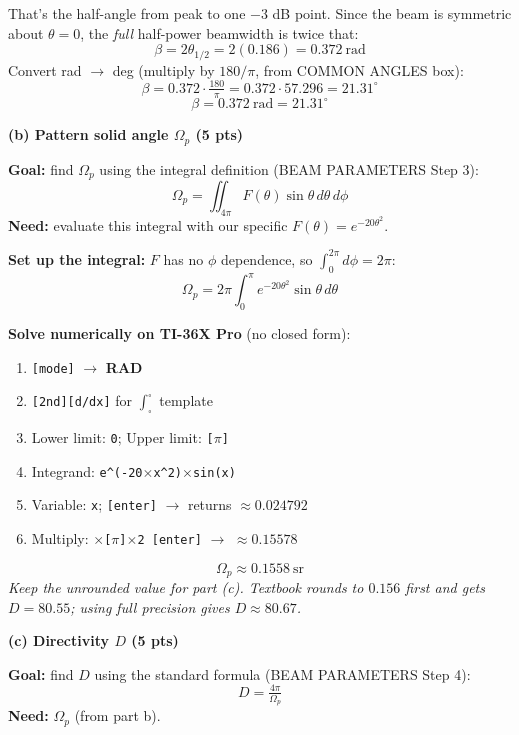 \documentclass[11pt,letterpaper]{article}
\newcommand{\goal}[1]{\textbf{\color{purple}Goal:} #1}
\newcommand{\need}[1]{\textbf{\color{coral}Need:} #1}
\begin{document}
That's the half-angle from peak to one $-3$ dB point. Since the beam is symmetric about $\theta = 0$, the \emph{full} half-power beamwidth is twice that:
\[\beta = 2\theta_{1/2} = 2(0.186) = 0.372~\text{rad}\]
Convert rad $\to$ deg (multiply by $180/\pi$, from COMMON ANGLES box):
\[\beta = 0.372 \cdot \tfrac{180}{\pi} = 0.372 \cdot 57.296 = 21.31^\circ\]
\[\boxed{\beta = 0.372~\text{rad} = 21.31^\circ}\]

\vspace{6pt}
\textbf{(b) Pattern solid angle $\Omega_p$ (5 pts)}

\begin{goalbox}
\goal{find $\Omega_p$ using the integral definition (BEAM PARAMETERS Step 3):}
\[\Omega_p = \iint_{4\pi} F(\theta)\sin\theta\,d\theta\,d\phi\]
\need{evaluate this integral with our specific $F(\theta) = e^{-20\theta^2}$.}
\end{goalbox}

\textbf{Set up the integral:} $F$ has no $\phi$ dependence, so $\int_0^{2\pi} d\phi = 2\pi$:
\[\Omega_p = 2\pi\!\int_0^{\pi} e^{-20\theta^2}\sin\theta\,d\theta\]

\textbf{Solve numerically on TI-36X Pro} (no closed form):
\begin{enumerate}\setlength{\itemsep}{0pt}
  \item \texttt{[mode]} $\to$ \textbf{RAD}
  \item \texttt{[2nd][d/dx]} for $\int_\square^\square$ template
  \item Lower limit: \texttt{0}; Upper limit: \texttt{[$\pi$]}
  \item Integrand: \texttt{e\^{}(-20$\times$x\^{}2)$\times$sin(x)}
  \item Variable: \texttt{x}; \texttt{[enter]} $\to$ returns $\approx 0.024792$
  \item Multiply: \texttt{$\times$[$\pi$]$\times$2 [enter]} $\to$ $\approx 0.15578$
\end{enumerate}

\[\boxed{\Omega_p \approx 0.1558~\text{sr}}\]
\textit{Keep the unrounded value for part (c). Textbook rounds to $0.156$ first and gets $D = 80.55$; using full precision gives $D \approx 80.67$.}

\vspace{6pt}
\textbf{(c) Directivity $D$ (5 pts)}

\begin{goalbox}
\goal{find $D$ using the standard formula (BEAM PARAMETERS Step 4):}
\[D = \tfrac{4\pi}{\Omega_p}\]
\need{$\Omega_p$ (from part b).}
\end{goalbox}
\end{document}
